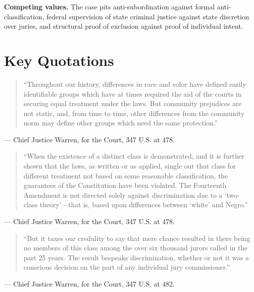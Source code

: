 \documentclass[12pt]{article}
\begin{document}
\textbf{Competing values.} The case pits anti-subordination against formal anti-classification, federal supervision of state criminal justice against state discretion over juries, and structural proof of exclusion against proof of individual intent.

\section{Key Quotations}

\begin{quote}
``Throughout our history, differences in race and color have defined easily identifiable groups which have at times required the aid of the courts in securing equal treatment under the laws. But community prejudices are not static, and, from time to time, other differences from the community norm may define other groups which need the same protection.''
\end{quote}
\noindent --- Chief Justice Warren, for the Court, 347 U.S. at 478.

\begin{quote}
``When the existence of a distinct class is demonstrated, and it is further shown that the laws, as written or as applied, single out that class for different treatment not based on some reasonable classification, the guarantees of the Constitution have been violated. The Fourteenth Amendment is not directed solely against discrimination due to a `two-class theory'---that is, based upon differences between `white' and Negro.''
\end{quote}
\noindent --- Chief Justice Warren, for the Court, 347 U.S. at 478.

\begin{quote}
``But it taxes our credulity to say that mere chance resulted in there being no members of this class among the over six thousand jurors called in the past 25 years. The result bespeaks discrimination, whether or not it was a conscious decision on the part of any individual jury commissioner.''
\end{quote}
\noindent --- Chief Justice Warren, for the Court, 347 U.S. at 482.
\end{document}
